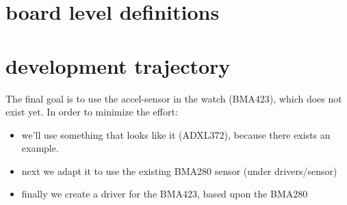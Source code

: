 \documentclass[letterpaper,10pt,english]{sphinxmanual}
\begin{document}
\section{board level definitions}
\label{\detokenize{i2c:board-level-definitions}}
\begin{sphinxVerbatim}[commandchars=\\\{\}]
     
 
 


        

 
          
          
          
          

\end{sphinxVerbatim}


\section{development trajectory}
\label{\detokenize{i2c:development-trajectory}}
The final goal is to use the accel-sensor in the watch (BMA423), which does not exist yet.
In order to minimize the effort:
\begin{itemize}
\item {} 
we’ll use something that looks like it (ADXL372), because there exists an example.

\item {} 
next we adapt it to use the existing BMA280 sensor (under drivers/sensor)

\item {} 
finally we create a driver for the BMA423, based upon the BMA280

\end{itemize}
\end{document}

